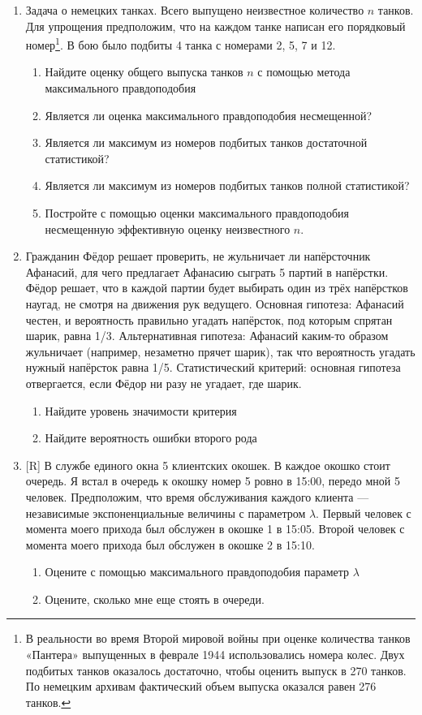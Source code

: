 \documentclass[12pt, a4paper]{article}\usepackage[]{graphicx}\usepackage[]{color}
\begin{document}
\begin{enumerate}
\item Задача о немецких танках. Всего выпущено неизвестное количество $n$ танков. Для упрощения предположим, что на каждом танке написан его порядковый номер\footnote{В реальности во время Второй мировой войны при оценке количества танков «Пантера» выпущенных в феврале 1944 использовались номера колес. Двух подбитых танков оказалось достаточно, чтобы оценить выпуск в 270 танков. По немецким архивам фактический объем выпуска оказался равен 276 танков. }. В бою было подбиты 4 танка с номерами 2, 5, 7 и 12.
\begin{enumerate}
\item Найдите оценку общего выпуска танков $n$ с помощью метода максимального правдоподобия
\item Является ли оценка максимального правдоподобия несмещенной?
\item Является ли максимум из номеров подбитых танков достаточной статистикой?
\item Является ли максимум из номеров подбитых танков полной статистикой?
\item Постройте с помощью оценки максимального правдоподобия несмещенную эффективную оценку неизвестного $n$.
\end{enumerate}

\item Гражданин Фёдор решает проверить, не жульничает ли напёрсточник Афанасий, для чего предлагает Афанасию сыграть 5 партий в напёрстки. Фёдор решает, что в каждой партии будет выбирать один из трёх напёрстков наугад, не смотря на движения рук ведущего. Основная гипотеза: Афанасий честен, и вероятность правильно угадать напёрсток, под которым спрятан шарик, равна 1/3. Альтернативная гипотеза: Афанасий каким-то образом жульничает (например, незаметно прячет шарик), так что вероятность угадать нужный напёрсток равна 1/5. Статистический критерий: основная гипотеза отвергается, если Фёдор ни разу не угадает, где шарик.
\begin{enumerate}
\item Найдите уровень значимости критерия
\item Найдите вероятность ошибки второго рода
\end{enumerate}

\item $[$R] В службе единого окна 5 клиентских окошек. В каждое окошко стоит очередь. Я встал в очередь к окошку номер 5 ровно в 15:00, передо мной 5 человек. Предположим, что время обслуживания каждого клиента — независимые экспоненциальные величины с параметром $\lambda$. Первый человек с момента моего прихода был обслужен в окошке 1 в 15:05. Второй человек с момента моего прихода был обслужен в окошке 2 в 15:10.
\begin{enumerate}
\item Оцените с помощью максимального правдоподобия параметр $\lambda$
\item Оцените, сколько мне еще стоять в очереди.
\end{enumerate}

\end{enumerate}
\end{document}
